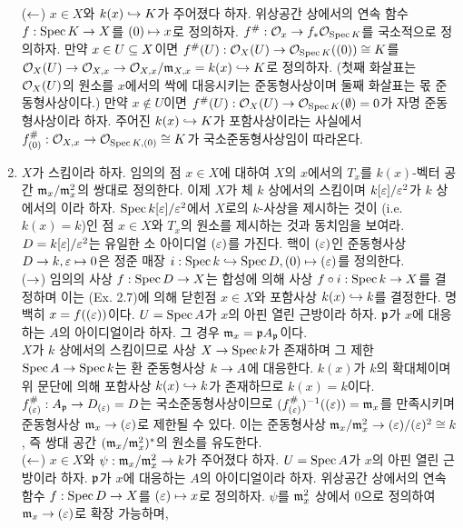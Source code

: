 \begin{enumerate}[label=\tb{2.\arabic*.},itemindent=0mm,itemsep=4mm]
	($\leftarrow$) $x\in X$와 $k(x)\hookrightarrow K$가 주어졌다 하자. 위상공간 상에서의 연속 함수 $f:\operatorname{Spec} K\rightarrow X$를 $(0)\mapsto x$로 정의하자.
	$f^\#:\mathcal{O}_x\rightarrow f_*\mathcal{O}_{\operatorname{Spec} K}$를 국소적으로 정의하자.
	만약 $x\in U\subseteq X$이면 $f^\#(U):\mathcal{O}_X(U)\rightarrow\mathcal{O}_{\operatorname{Spec} K}((0))\cong K$를
	$\mathcal{O}_X(U)\rightarrow\mathcal{O}_{X,x}\rightarrow\mathcal{O}_{X,x}/\mathfrak{m}_{X,x}=k(x)\hookrightarrow K$로 정의하자.
	(첫째 화살표는 $\mathcal{O}_X(U)$의 원소를 $x$에서의 싹에 대응시키는 준동형사상이며 둘째 화살표는 몫 준동형사상이다.)
	만약 $x\notin U$이면 $f^\#(U):\mathcal{O}_X(U)\rightarrow\mathcal{O}_{\operatorname{Spec} K}(\emptyset)=0$가 자명 준동형사상이라 하자.
	주어진 $k(x)\hookrightarrow K$가 포함사상이라는 사실에서
	$f_{(0)}^\#:\mathcal{O}_{X,x}\rightarrow\mathcal{O}_{\operatorname{Spec} K,(0)}\cong K$가 국소준동형사상임이 따라온다.
	\item $X$가 스킴이라 하자. 임의의 점 $x\in X$에 대하여 $X$의 $x$에서의  $T_x$를
	$k(x)$-벡터 공간 $\mathfrak{m}_x/\mathfrak{m}_x^2$의 쌍대로 정의한다.
	이제 $X$가 체 $k$ 상에서의 스킴이며 $k[\varepsilon]/\varepsilon^2$가 $k$ 상에서의 이라 하자.
	$\operatorname{Spec} k[\varepsilon]/\varepsilon^2$에서 $X$로의 $k$-사상을 제시하는 것이
	(i.e. $k(x)=k$)인 점 $x\in X$와 $T_x$의 원소를 제시하는 것과 동치임을 보여라.\\
	\sol $D=k[\varepsilon]/\varepsilon^2$는 유일한 소 아이디얼 $(\varepsilon)$를 가진다.
	핵이 $(\varepsilon)$인 준동형사상 $D\rightarrow k,\varepsilon\mapsto 0$은 정준 매장 $i:\operatorname{Spec} k\hookrightarrow\operatorname{Spec} D,(0)\mapsto(\varepsilon)$를 정의한다.\\
	($\rightarrow$) 임의의 사상 $f:\operatorname{Spec} D\rightarrow X$는 합성에 의해 사상 $f\circ i:\operatorname{Spec} k\rightarrow X$를 결정하며
	이는 (Ex. 2.7)에 의해 닫힌점 $x\in X$와 포함사상 $k(x)\hookrightarrow k$를 결정한다. 명백히 $x=f((\varepsilon))$이다.
	$U=\operatorname{Spec} A$가 $x$의 아핀 열린 근방이라 하자. $\mathfrak{p}$가 $x$에 대응하는 $A$의 아이디얼이라 하자.
	그 경우 $\mathfrak{m}_x=\mathfrak{p}A_{\mathfrak{p}}$이다.\\
	$X$가 $k$ 상에서의 스킴이므로 사상 $X\rightarrow\operatorname{Spec} k$가 존재하며 그 제한 $\operatorname{Spec} A\rightarrow\operatorname{Spec} k$는 환 준동형사상 $k\rightarrow A$에 대응한다.
	$k(x)$가 $k$의 확대체이며 위 문단에 의해 포함사상 $k(x)\hookrightarrow k$가 존재하므로 $k(x)=k$이다.
	$f^\#_{(\varepsilon)}:A_{\mathfrak{p}}\rightarrow D_{(\varepsilon)}=D$는 국소준동형사상이므로 $(f^\#_{(\varepsilon)})^{-1}((\varepsilon))=\mathfrak{m}_x$를 만족시키며
	준동형사상 $\mathfrak{m}_x\rightarrow(\varepsilon)$로 제한될 수 있다.
	이는 준동형사상 $\mathfrak{m}_x/\mathfrak{m}_x^2\rightarrow(\varepsilon)/(\varepsilon)^2\cong k$, 즉 쌍대 공간 $(\mathfrak{m}_x/\mathfrak{m}_x^2)^*$의 원소를 유도한다.\\
	($\leftarrow$) $x\in X$와 $\psi:\mathfrak{m}_x/\mathfrak{m}_x^2\rightarrow k$가 주어졌다 하자. $U=\operatorname{Spec} A$가 $x$의 아핀 열린 근방이라 하자.
	$\mathfrak{p}$가 $x$에 대응하는 $A$의 아이디얼이라 하자. 위상공간 상에서의 연속 함수 $f:\operatorname{Spec} D\rightarrow X$를 $(\varepsilon)\mapsto x$로 정의하자.
	$\psi$를 $\mathfrak{m}_x^2$ 상에서 0으로 정의하여 $\mathfrak{m}_x\rightarrow(\varepsilon)$로 확장 가능하며,

\end{enumerate}
